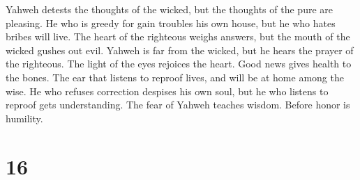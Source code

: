  Yahweh detests the thoughts of the wicked, but the
thoughts of the pure are pleasing.  He who is greedy for
gain troubles his own house, but he who hates bribes will live.
 The heart of the righteous weighs answers, but the mouth
of the wicked gushes out evil.  Yahweh is far from the
wicked, but he hears the prayer of the righteous.  The
light of the eyes rejoices the heart. Good news gives health to the
bones.  The ear that listens to reproof lives, and will
be at home among the wise.  He who refuses correction
despises his own soul, but he who listens to reproof gets understanding.
 The fear of Yahweh teaches wisdom. Before honor is
humility.

\hypertarget{section-15}{%
\section{16}\label{section-15}}

